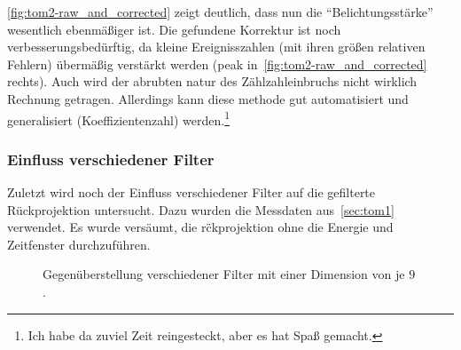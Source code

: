 \documentclass[slug=PET, room=Andreas-Schubert-Bau\,\ 424A, supervisor=Carsten\ Bittrich, coursedate=10.\ 01.\ 2020]{../../Lab_Report_LaTeX/lab_report}
\begin{document}
\ref{fig:tom2-raw_and_corrected} zeigt deutlich, dass nun die
``Belichtungsst\"arke'' wesentlich ebenm\"a\ss{}iger ist. Die
gefundene Korrektur ist noch verbesserungsbed\"urftig, da kleine
Ereignisszahlen (mit ihren gr\"o\ss{}en relativen Fehlern)
\"uberm\"a\ss{}ig verst\"arkt werden (peak
in~\ref{fig:tom2-raw_and_corrected} rechts). Auch wird der abrubten
natur des Z\"ahlzahleinbruchs nicht wirklich Rechnung
getragen. Allerdings kann diese methode gut automatisiert und
generalisiert (Koeffizientenzahl) werden.\footnote{Ich habe da zuviel
  Zeit reingesteckt, aber es hat Spa\ss{} gemacht.}

\subsubsection{Einfluss verschiedener Filter}
\label{sec:filter}

Zuletzt wird noch der Einfluss verschiedener Filter auf die gefilterte Rückprojektion
untersucht. Dazu wurden die Messdaten aus~\ref{sec:tom1} verwendet. Es
wurde vers\"aumt, die r\"ckprojektion ohne die Energie und Zeitfenster
durchzuf\"uhren.

\begin{figure}[h]
  \centering
  \caption{Gegenüberstellung verschiedener Filter mit einer Dimension
    von je \(9\).}
  \label{fig:filter}
\end{figure}
\end{document}
